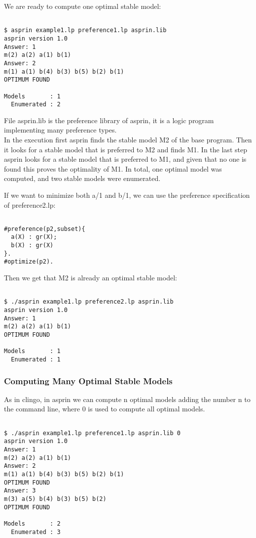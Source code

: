  We are ready to compute one optimal stable model: 
\begin{verbatim}

$ asprin example1.lp preference1.lp asprin.lib
asprin version 1.0
Answer: 1
m(2) a(2) a(1) b(1)
Answer: 2
m(1) a(1) b(4) b(3) b(5) b(2) b(1)
OPTIMUM FOUND

Models       : 1
  Enumerated : 2

\end{verbatim}

 File asprin.lib is the preference library of asprin, it is a logic program implementing many preference types.
\\ In the execution first asprin finds the stable model M2 of the base program. Then it looks for a stable model that is preferred to M2 and finds M1. In the last step asprin looks for a stable model that is preferred to M1,  and given that no one is found this proves the optimality of M1. In total, one optimal model was computed, and two stable models were enumerated. 

 If we want to minimize both a/1 and b/1, we can use the preference specification of preference2.lp: 
\begin{verbatim}

#preference(p2,subset){                                                                                             
  a(X) : gr(X);                                                                                                   
  b(X) : gr(X)                                                                                                    
}.
#optimize(p2).
\end{verbatim}

 Then we get that M2 is already an optimal stable model: 
\begin{verbatim}

$ ./asprin example1.lp preference2.lp asprin.lib
asprin version 1.0
Answer: 1
m(2) a(2) a(1) b(1)
OPTIMUM FOUND

Models       : 1
  Enumerated : 1
\end{verbatim}

\subsubsection{Computing Many Optimal Stable Models}

 As in clingo, in asprin  we can compute n optimal models adding the number n to the command line,  where 0 is used to compute all optimal models. 
\begin{verbatim}

$ ./asprin example1.lp preference1.lp asprin.lib 0
asprin version 1.0
Answer: 1
m(2) a(2) a(1) b(1)
Answer: 2
m(1) a(1) b(4) b(3) b(5) b(2) b(1)
OPTIMUM FOUND
Answer: 3
m(3) a(5) b(4) b(3) b(5) b(2)
OPTIMUM FOUND

Models       : 2
  Enumerated : 3

\end{verbatim}

